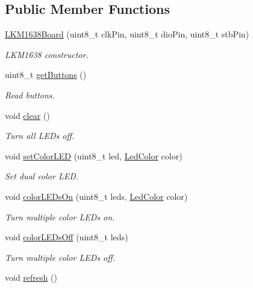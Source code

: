 \subsection*{Public Member Functions}
\begin{DoxyCompactItemize}
\item 
\hyperlink{class_l_k_m1638_board_a8526eb1bc413de3ea12c78b79d5d4bef}{L\+K\+M1638\+Board} (uint8\+\_\+t clk\+Pin, uint8\+\_\+t dio\+Pin, uint8\+\_\+t stb\+Pin)
\begin{DoxyCompactList}\small\item\em L\+K\+M1638 constructor. \end{DoxyCompactList}\item 
uint8\+\_\+t \hyperlink{class_l_k_m1638_board_a46b3777daa6d86b5a0e871fb99604898}{get\+Buttons} ()
\begin{DoxyCompactList}\small\item\em Read buttons. \end{DoxyCompactList}\item 
void \hyperlink{class_l_k_m1638_board_a487398df6c28769e87f20ea51e1395ee}{clear} ()\hypertarget{class_l_k_m1638_board_a487398df6c28769e87f20ea51e1395ee}{}\label{class_l_k_m1638_board_a487398df6c28769e87f20ea51e1395ee}

\begin{DoxyCompactList}\small\item\em Turn all L\+ED\textquotesingle{}s off. \end{DoxyCompactList}\item 
void \hyperlink{class_l_k_m1638_board_a58ee1bc95f31491e1e3d1bd67a85ca07}{set\+Color\+L\+ED} (uint8\+\_\+t led, \hyperlink{_l_k_m1638_board_8h_a81ea3de5b76240d46410f8b9acf4cbde}{Led\+Color} color)
\begin{DoxyCompactList}\small\item\em Set dual color L\+ED. \end{DoxyCompactList}\item 
void \hyperlink{class_l_k_m1638_board_a9c563169a60f4010b89449dce438ccb7}{color\+L\+E\+Ds\+On} (uint8\+\_\+t leds, \hyperlink{_l_k_m1638_board_8h_a81ea3de5b76240d46410f8b9acf4cbde}{Led\+Color} color)
\begin{DoxyCompactList}\small\item\em Turn multiple color L\+ED\textquotesingle{}s on. \end{DoxyCompactList}\item 
void \hyperlink{class_l_k_m1638_board_abf401ad1fa384a03732ed6e6d558ba2b}{color\+L\+E\+Ds\+Off} (uint8\+\_\+t leds)
\begin{DoxyCompactList}\small\item\em Turn multiple color L\+ED\textquotesingle{}s off. \end{DoxyCompactList}\item 
void \hyperlink{class_l_k_m1638_board_affcd16cf2844a7596f08251fab8e0d40}{refresh} ()\hypertarget{class_l_k_m1638_board_affcd16cf2844a7596f08251fab8e0d40}{}\label{class_l_k_m1638_board_affcd16cf2844a7596f08251fab8e0d40}


\end{DoxyCompactItemize}
